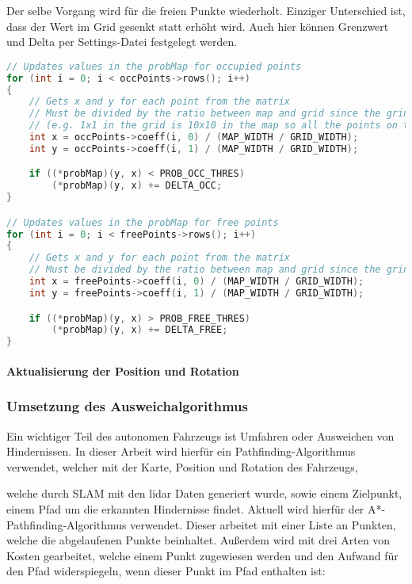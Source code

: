 Der selbe Vorgang wird für die freien Punkte wiederholt.
Einziger Unterschied ist, dass der Wert im Grid gesenkt statt erhöht wird.
Auch hier können Grenzwert und Delta per Settings-Datei festgelegt werden.

\begin{lstlisting}[caption={Auschnitt aus updateProbMap},label={lst:update-prob-map},language={C++}]
// Updates values in the probMap for occupied points
for (int i = 0; i < occPoints->rows(); i++)
{
    // Gets x and y for each point from the matrix
    // Must be divided by the ratio between map and grid since the grind is a fraction of the size to allow for some error
    // (e.g. 1x1 in the grid is 10x10 in the map so all the points on the map that lay in this 10x10 area will change the value of probability at that single point in the grid)
    int x = occPoints->coeff(i, 0) / (MAP_WIDTH / GRID_WIDTH);
    int y = occPoints->coeff(i, 1) / (MAP_WIDTH / GRID_WIDTH);

    if ((*probMap)(y, x) < PROB_OCC_THRES)
        (*probMap)(y, x) += DELTA_OCC;
}

// Updates values in the probMap for free points
for (int i = 0; i < freePoints->rows(); i++)
{
    // Gets x and y for each point from the matrix
    // Must be divided by the ratio between map and grid since the grind is a fraction of the size to allow for some error
    int x = freePoints->coeff(i, 0) / (MAP_WIDTH / GRID_WIDTH);
    int y = freePoints->coeff(i, 1) / (MAP_WIDTH / GRID_WIDTH);

    if ((*probMap)(y, x) > PROB_FREE_THRES)
        (*probMap)(y, x) += DELTA_FREE;
}
\end{lstlisting}

\paragraph{Aktualisierung der Position und Rotation}
\label{position_update}




\subsubsection{Umsetzung des Ausweichalgorithmus}

Ein wichtiger Teil des autonomen Fahrzeugs ist Umfahren oder Ausweichen von Hindernissen. 
In dieser Arbeit wird hierfür ein Pathfinding-Algorithmus verwendet, welcher mit der Karte, Position und Rotation des Fahrzeugs, 

welche durch SLAM mit den \ac{lidar} Daten generiert wurde, sowie einem Zielpunkt, einem Pfad um die erkannten Hindernisse findet. 
Aktuell wird hierfür der A*-Pathfinding-Algorithmus verwendet. Dieser arbeitet mit einer Liste an Punkten, welche die abgelaufenen Punkte beinhaltet. 
Außerdem wird mit drei Arten von Kosten gearbeitet, welche einem Punkt zugewiesen werden und den Aufwand für den Pfad widerspiegeln, 
wenn dieser Punkt im Pfad enthalten ist:

